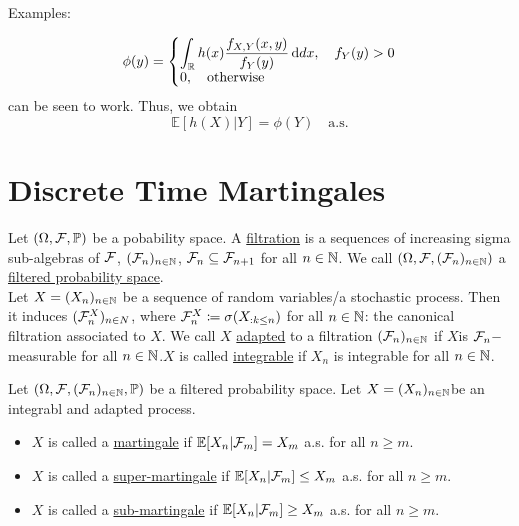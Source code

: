 \documentclass{article}
\begin{document}
\begin{examplesblock}{Examples: }
\begin{enumerate}
\[
\phi(y) = \left\lbrace
\begin{array}{@{}l@{}}
    \displaystyle\int_{\R} h(x)\frac{f_{X,Y}(x,y)}{f_{Y}(y)} \diff dx, \quad f_{Y}(y)>0   \\
    0, \quad \text{otherwise}
\end{array}\right.
\]
can be seen to work. Thus, we obtain 
\[
	\mathbb{E}[h(X)|Y] = \phi(Y) \quad \text{a.s.}
\]
	
\end{enumerate}
\end{examplesblock}


\section{Discrete Time Martingales}

\begin{boxdef}[Filtration]\label{def: filtration}
	Let $ (\Omega, \mathcal{F}, \mathbb{P})$ be a pobability space. A \underline{filtration} is a sequences of increasing sigma sub-algebras of $ \mathcal{F}$, $ (\mathcal{F}_{n})_{n\in \mathbb{N}}$, $ \mathcal{F}_{n}\subseteq \mathcal{F}_{n+1}$ for all $ n\in \mathbb{N}$. We call $ (\Omega, \mathcal{F}, (\mathcal{F}_{n})_{n\in\mathbb{N}})$ a \underline{filtered probability space}.\\ 

	Let $X =  (X_{n})_{n\in \mathbb{N}}$ be a sequence of random variables/a stochastic process. Then it induces $ (\mathcal{F}^{X}_{n})_{n\in N}$, where $ \mathcal{F}^{X}_{n}\coloneqq \sigma(X_{:k\leq n})$ for all $ n\in \mathbb{N}$: the canonical filtration associated to $ X$. We call $ X$ \underline{adapted} to a filtration $ (\mathcal{F}_{n})_{n\in \mathbb{N}}$ if $ X$is $ \mathcal{F}_{n}-$measurable for all $ n\in \mathbb{N}$.$ X$ is called \underline{integrable} if $ X_{n}$ is integrable for all $ n\in \mathbb{N}$.
\end{boxdef}

\begin{boxdef}\label{def: martingale}
Let $ (\Omega, \mathcal{F}, (\mathcal{F}_{n})_{n\in\mathbb{N}}, \mathbb{P})$ be a filtered probability space. Let $ X = (X_{n})_{n\in \mathbb{N}}$be an integrabl and adapted process. 
\begin{itemize}
	\item $ X$ is called a \underline{martingale} if $ \mathbb{E}[X_{n}| \mathcal{F}_{m}]=X_{m}$ a.s. for all $ n\geq m$.
	\item $ X$ is called a \underline{super-martingale} if $ \mathbb{E}[X_{n}| \mathcal{F}_{m}]\leq X_{m}$ a.s. for all $ n\geq m$.
        \item $ X$ is called a \underline{sub-martingale} if $ \mathbb{E}[X_{n}| \mathcal{F}_{m}]\geq X_{m}$ a.s. for all $ n\geq m$.
\end{itemize}

\end{boxdef}
\end{document}
